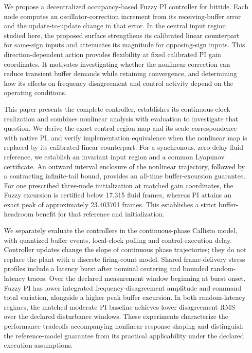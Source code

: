 We propose a decentralized occupancy-based Fuzzy PI controller for bittide. Each node computes an oscillator-correction increment from its receiving-buffer error and the update-to-update change in that error. In the central input region studied here, the proposed surface strengthens its calibrated linear counterpart for same-sign inputs and attenuates its magnitude for opposing-sign inputs. This direction-dependent action provides flexibility at fixed calibrated PI gain coordinates. It motivates investigating whether the nonlinear correction can reduce transient buffer demands while retaining convergence, and determining how its effects on frequency disagreement and control activity depend on the operating conditions.

This paper presents the complete controller, establishes its con\-tinuous-clock realization and combines nonlinear analysis with evaluation to investigate that question. We derive the exact central-region map and its scale correspondence with native PI, and verify implementation equivalence when the nonlinear map is replaced by its calibrated linear counterpart. For a synchronous, zero-delay fluid reference, we establish an invariant input region and a common Lyapunov certificate. An outward interval enclosure of the nonlinear trajectory, followed by a contracting infinite-tail bound, provides an all-time buffer-excursion guarantee. For one prescribed three-node initialization at matched gain coordinates, the Fuzzy excursion is certified below 17.315 fluid frames, whereas PI attains an exact peak of approximately 23.403701 frames. This establishes a strict buffer-headroom benefit for that reference and initialization.

We separately evaluate the controllers in the continuous-phase Callisto model, with quantized buffer events, local-clock polling and control-execution delay. Controller updates change the slope of continuous phase trajectories; they do not replace the plant with a discrete firing-count model. Shared frame-delivery stress profiles include a latency burst after nominal centering and bounded random-latency traces. Over the declared measurement window beginning at burst onset, Fuzzy PI has lower integrated frequency-disagreement amplitude and command total variation, alongside a higher peak buffer excursion. In both random-latency regimes, the matched moderate PI baseline achieves lower disagreement RMS over the declared disturbance windows. These experiments characterize the performance tradeoffs accompanying nonlinear response shaping and distinguish the reference-model guarantee from its practical applicability under the declared execution assumptions.

